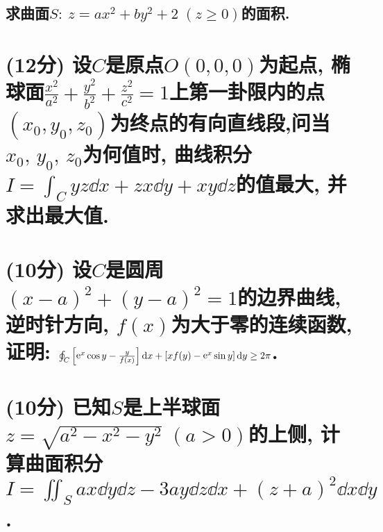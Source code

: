 \documentclass[12pt]{ctexart}
\DeclareMathOperator{\ee}{\mathrm{e}}
\begin{document}
\subsection{求曲面$S:\:z=ax^{2}+by^{2}+2\;(z\ge0)$的面积.}
\section{(12分) 设$C$是原点$O(0,0,0)$为起点, 椭球面$\frac{x^{2}}{a^{2}}+\frac{y^{2}}{b^{2}}+\frac{z^{2}}{c^{2}}=1$上第一卦限内的点$(x_0,y_0,z_0)$为终点的有向直线段,问当$x_0,\,y_0,\,z_0$为何值时, 曲线积分$I=\int_{C}yz\dd{x}+zx\dd{y}+xy\dd{z}$的值最大, 并求出最大值.}
\section{(10分) 设$C$是圆周$(x-a)^{2}+(y-a)^{2}=1$的边界曲线, 逆时针方向, $f(x)$为大于零的连续函数, 证明: $\oint_{C}\qty[\ee^{x}\cos{y}-\frac{y}{f(x)}]\dd{x}+\qty[xf(y)-\ee^{x}\sin{y}]\dd{y}\ge2\pi$.}
\section{(10分) 已知$S$是上半球面$z=\sqrt{a^{2}-x^{2}-y^{2}}\;(a>0)$的上侧, 计算曲面积分$I=\iint_{S}ax\dd{y}\dd{z}-3ay\dd{z}\dd{x}+(z+a)^{2}\dd{x}\dd{y}$.}
\end{document}
